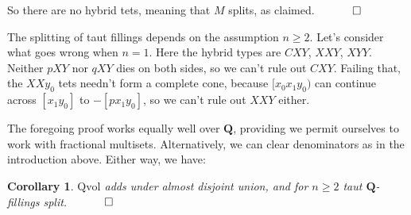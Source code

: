 \documentclass[12pt]{article}
\newtheorem{corollary}{Corollary}
\newcommand{\proofend}{$\quad \qed$}
\def\QQ{\mathbf{Q}}
\newcommand{\kw}{\mathrm}
\newcommand{\Qvol}{\kw{Qvol}}
\begin{document}
So there are no hybrid tets, meaning that $M$ splits, as claimed.
\proofend

The splitting of taut fillings depends on the assumption $n\geq 2$.
Let's consider what goes wrong when $n=1$.
Here the hybrid types are $CXY$, $XXY$, $XYY$.
Neither $pXY$ nor $qXY$ dies on both sides, so we can't rule out $CXY$.
Failing that, the $XXy_0$ tets needn't form a complete cone,
because $[x_0x_1y_0)$ can continue across $[x_1 y_0]$ to $-[p x_1 y_0]$,
so we can't rule out $XXY$ either.

The foregoing proof works equally well over $\QQ$, providing we
permit ourselves to work with fractional multisets.
Alternatively, we can clear denominators as in the introduction
above.
Either way, we have:

\begin{corollary} \label{cor1}
$\Qvol$ adds under almost disjoint union,
and for $n \geq 2$
taut $\QQ$-fillings split.
\proofend
\end{corollary}
\end{document}

